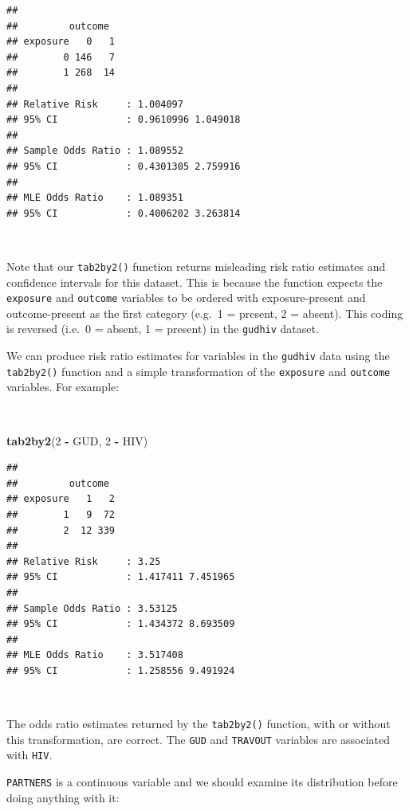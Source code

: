 \documentclass[12pt,a4paper]{book}
\newenvironment{Shaded}{\begin{snugshade}}{\end{snugshade}}
\newcommand{\KeywordTok}[1]{\textcolor[rgb]{0.13,0.29,0.53}{\textbf{#1}}}
\newcommand{\DecValTok}[1]{\textcolor[rgb]{0.00,0.00,0.81}{#1}}
\newcommand{\StringTok}[1]{\textcolor[rgb]{0.31,0.60,0.02}{#1}}
\newcommand{\OperatorTok}[1]{\textcolor[rgb]{0.81,0.36,0.00}{\textbf{#1}}}
\newcommand{\NormalTok}[1]{#1}
\theoremstyle{definition}
\theoremstyle{definition}
\theoremstyle{definition}
\theoremstyle{remark}
\begin{document}
\begin{verbatim}
## 
##         outcome
## exposure   0   1
##        0 146   7
##        1 268  14
## 
## Relative Risk     : 1.004097 
## 95% CI            : 0.9610996 1.049018 
## 
## Sample Odds Ratio : 1.089552 
## 95% CI            : 0.4301305 2.759916 
## 
## MLE Odds Ratio    : 1.089351 
## 95% CI            : 0.4006202 3.263814
\end{verbatim}

~

Note that our \texttt{tab2by2()} function returns misleading risk ratio
estimates and confidence intervals for this dataset. This is because the
function expects the \texttt{exposure} and \texttt{outcome} variables to
be ordered with exposure-present and outcome-present as the first
category (e.g.~1 = present, 2 = absent). This coding is reversed (i.e.~0
= absent, 1 = present) in the \texttt{gudhiv} dataset.

\newpage

We can produce risk ratio estimates for variables in the \texttt{gudhiv}
data using the \texttt{tab2by2()} function and a simple transformation
of the \texttt{exposure} and \texttt{outcome} variables. For example:

~

\begin{Shaded}
\begin{Highlighting}[]
\KeywordTok{tab2by2}\NormalTok{(}\DecValTok{2} \OperatorTok{-}\StringTok{ }\NormalTok{GUD, }\DecValTok{2} \OperatorTok{-}\StringTok{ }\NormalTok{HIV)}
\end{Highlighting}
\end{Shaded}

\begin{verbatim}
## 
##         outcome
## exposure   1   2
##        1   9  72
##        2  12 339
## 
## Relative Risk     : 3.25 
## 95% CI            : 1.417411 7.451965 
## 
## Sample Odds Ratio : 3.53125 
## 95% CI            : 1.434372 8.693509 
## 
## MLE Odds Ratio    : 3.517408 
## 95% CI            : 1.258556 9.491924
\end{verbatim}

~

The odds ratio estimates returned by the \texttt{tab2by2()} function,
with or without this transformation, are correct. The \texttt{GUD} and
\texttt{TRAVOUT} variables are associated with \texttt{HIV}.

\texttt{PARTNERS} is a continuous variable and we should examine its
distribution before doing anything with it:
\end{document}
